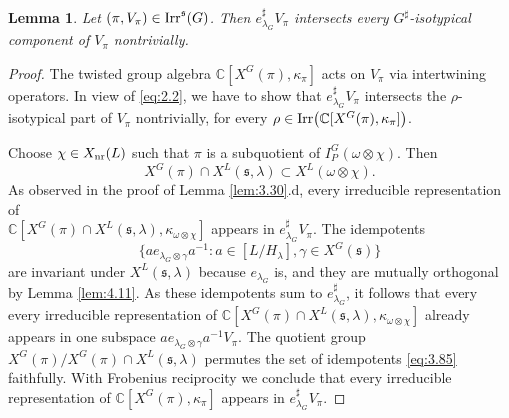 \documentclass[11pt]{amsart}
\newtheorem{lem}[thm]{Lemma}
\theoremstyle{definition}
\begin{document}
\begin{lem}\label{lem:3.31}
Let $(\pi,V_\pi) \in {{\rm Irr}}^{{\mathfrak s}} (G)$. Then $e^\sharp_{\lambda_G} V_\pi$ intersects every
$G^\sharp$-isotypical component of $V_\pi$ nontrivially.
\end{lem}
\begin{proof}
The twisted group algebra ${\mathbb C} [X^G (\pi), \kappa_\pi]$ acts on $V_\pi$ via intertwining
operators. In view of \eqref{eq:2.2}, we have to show that $e^\sharp_{\lambda_G} V_\pi$
intersects the $\rho$-isotypical part of $V_\pi$ nontrivially, for every $\rho \in
{{\rm Irr}} \big( {\mathbb C} [X^G (\pi), \kappa_\pi] \big)$.

Choose $\chi \in X_{{\rm nr}} (L)$ such that $\pi$ is a subquotient of $I_P^G (\omega
\otimes \chi)$. Then 
\[
X^G (\pi) \cap X^L ({{\mathfrak s}},\lambda) \subset X^L (\omega \otimes \chi) .
\]
As observed in the proof of Lemma \ref{lem:3.30}.d, every irreducible representation of\\ 
${\mathbb C} [X^G (\pi) \cap X^L ({{\mathfrak s}},\lambda), \kappa_{\omega \otimes \chi}]$ appears in
$e^\sharp_{\lambda_G} V_\pi$. The idempotents 
\begin{equation}\label{eq:3.85}
\{a e_{\lambda_G \otimes \gamma} a^{-1} : a \in [L / H_\lambda], \gamma \in X^G ({{\mathfrak s}}) \}
\end{equation}
are invariant under $X^L ({{\mathfrak s}},\lambda)$ because $e_{\lambda_G}$ is, and they are mutually
orthogonal by Lemma \ref{lem:4.11}. As these idempotents sum to $e^\sharp_{\lambda_G}$, it 
follows that every every irreducible representation of 
${\mathbb C} [X^G (\pi) \cap X^L ({{\mathfrak s}},\lambda), \kappa_{\omega \otimes \chi}]$ already 
appears in one subspace $a e_{\lambda_G \otimes \gamma} a^{-1} V_\pi$. The quotient
group $X^G (\pi) / X^G (\pi) \cap X^L ({{\mathfrak s}},\lambda)$ permutes the set of idempotents
\eqref{eq:3.85} faithfully. With Frobenius reciprocity we conclude that every irreducible
representation of ${\mathbb C} [X^G (\pi), \kappa_\pi]$ appears in $e^\sharp_{\lambda_G} V_\pi$.
\end{proof}
\end{document}

